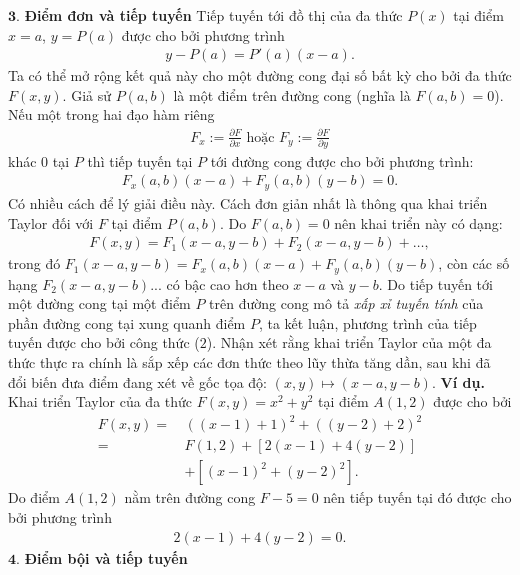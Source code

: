 \begin{multicols}{2}
	$\pmb{3.}$ \textbf{\color{duongvaotoanhoc}Điểm đơn và tiếp tuyến}
	\vskip 0.1cm
	Tiếp tuyến tới đồ thị của đa thức $P(x)$ tại điểm $x=a$, $y=P(a)$ được cho bởi phương trình
	\begin{align*}
		y-P(a)=P'(a)(x-a).
	\end{align*}
	Ta có thể mở rộng kết quả này cho một đường cong đại số bất kỳ cho bởi đa thức $F(x,y)$. Giả sử $P(a,b)$ là một điểm trên đường cong (nghĩa là $F(a,b)=0$). Nếu một trong hai đạo hàm riêng 
	\begin{align*}
		F_x:=\frac{\partial F}{\partial x} \textrm{ hoặc } F_y:=\frac{\partial F}{\partial y}
	\end{align*}
	khác $0$ tại $P$ thì tiếp tuyến tại $P$ tới đường cong được cho bởi phương trình:
	\begin{align*}
		F_x(a,b)(x-a)+F_y(a,b) (y-b)=0. \tag{$2$}
	\end{align*}
	Có nhiều cách để lý giải điều này. Cách đơn giản nhất là thông qua khai triển Taylor đối với $F$ tại điểm $P(a,b)$. Do $F(a,b)=0$ nên khai triển này có dạng:
	\begin{align*}
		F(x,y)=F_1(x-a,y-b)+F_2(x-a,y-b)+\ldots,
	\end{align*}
	trong đó $F_1(x-a,y-b)= F_x(a,b)(x-a)+F_y(a,b)(y-b)$, còn các số hạng $F_2(x-a,y-b)$... có bậc cao hơn theo $x-a$ và $y-b$.  Do tiếp tuyến tới một đường cong tại một điểm $P$ trên đường cong mô tả \textit{xấp xỉ tuyến tính} của phần đường cong tại xung quanh điểm $P$, ta kết luận, phương trình của tiếp tuyến được cho bởi công thức ($2$).
	\vskip 0.1cm
	Nhận xét rằng khai triển Taylor của một đa thức thực ra chính là sắp xếp các đơn thức theo lũy thừa tăng dần, sau khi đã đổi biến đưa điểm đang xét về gốc tọa độ: $(x,y)\mapsto (x-a,y-b)$. 
	\vskip 0.1cm
	\vskip 0.1cm
	\textbf{\color{duongvaotoanhoc}Ví dụ.} Khai triển Taylor của đa thức 
	$F(x,y)=x^2+y^2$ 
	tại điểm $A(1,2)$ được cho bởi
	\begin{align*}
		F(x,y)=\,&((x-1)+1)^2+((y-2)+2)^2\\
		=\,&F(1,2)+[2(x-1)+4(y-2)]\\
		&+[(x-1)^2+(y-2)^2].
	\end{align*}
	Do điểm $A(1,2)$ nằm trên đường cong $F-5=0$ nên tiếp tuyến tại đó được cho bởi phương trình
	\begin{align*}
		2(x-1)+4(y-2)=0.
	\end{align*}
	$\pmb{4.}$ \textbf{\color{duongvaotoanhoc}Điểm bội và tiếp tuyến}

\end{multicols}
